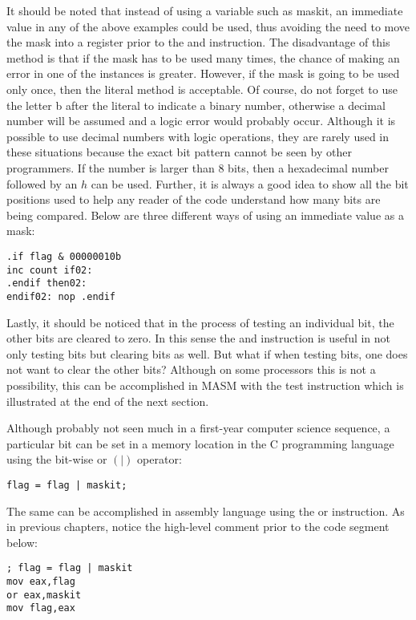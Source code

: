 \documentclass[10pt]{article}
\begin{document}
It should be noted that instead of using a variable such as maskit, an immediate value in any of the above examples could be used, thus avoiding the need to move the mask into a register prior to the and instruction. The disadvantage of this method is that if the mask has to be used many times, the chance of making an error in one of the instances is greater. However, if the mask is going to be used only once, then the literal method is acceptable. Of course, do not forget to use the letter b after the literal to indicate a binary number, otherwise a decimal number will be assumed and a logic error would probably occur. Although it is possible to use decimal numbers with logic operations, they are rarely used in these situations because the exact bit pattern cannot be seen by other programmers. If the number is larger than 8 bits, then a hexadecimal number followed by an $h$ can be used. Further, it is always a good idea to show all the bit positions used to help any reader of the code understand how many bits are being compared. Below are three different ways of using an immediate value as a mask:

\begin{verbatim}
.if flag & 00000010b
inc count if02:
.endif then02:
endif02: nop .endif
\end{verbatim}

Lastly, it should be noticed that in the process of testing an individual bit, the other bits are cleared to zero. In this sense the and instruction is useful in not only testing bits but clearing bits as well. But what if when testing bits, one does not want to clear the other bits? Although on some processors this is not a possibility, this can be accomplished in MASM with the test instruction which is illustrated at the end of the next section.

Although probably not seen much in a first-year computer science sequence, a particular bit can be set in a memory location in the C programming language using the bit-wise or $(\mid)$ operator:

\begin{verbatim}
flag = flag | maskit;
\end{verbatim}

The same can be accomplished in assembly language using the or instruction. As in previous chapters, notice the high-level comment prior to the code segment below:

\begin{verbatim}
; flag = flag | maskit
mov eax,flag
or eax,maskit
mov flag,eax
\end{verbatim}
\end{document}

